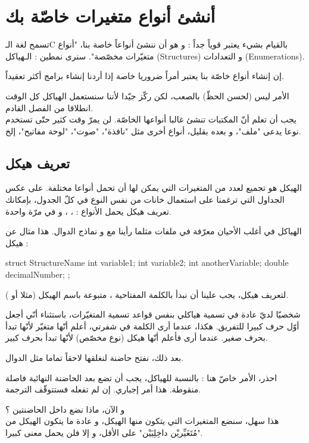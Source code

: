 \chapter{أنشئ أنواع متغيرات خاصّة بك}
تسمح لغة الـ\textenglish{C}
بالقيام بشيء يعتبر قوياً جداً : و هو أن ننشئ أنواعاً خاصة بنا، "أنواع متغيّرات مخصّصة". سنرى نمطين : الـهياكل
(\textenglish{Structures})
و التعدادات
(\textenglish{Enumerations}).

 إن إنشاء أنواع خاصّة بنا يعتبر أمراً ضروريا خاصة إذا أردنا إنشاء برامج أكثر تعقيداً.

الأمر ليس  (لحسن الحظّ) بالصعب، لكن ركّز جيّدا لأننا سنستعمل الهياكل كل الوقت انطلاقا من الفصل القادم.\\
يجب أن تعلم أنّ المكتبات تنشئ غالبا أنواعها الخاصّة. لن يمرّ وقت كثير حتّى تستخدم نوعا يدعى "ملف"، و بعده بقليل، أنواع أخرى مثل "نافذة"، "صوت"، "لوحة مفاتيح"، إلخ.

\section{تعريف هيكل}
الهيكل هو تجميع لعدد من المتغيرات التي يمكن لها أن تحمل أنواعا مختلفة. على عكس الجداول التي ترغمنا على استعمال خانات من نفس النوع في كلّ الجدول، بإمكانك تعريف هيكل يحمل الأنواع :
، ، 
و
في مرّة واحدة.

الهياكل في أغلب الأحيان معرّفة في ملفات
مثلما رأينا مع
و نماذج الدوال. هذا مثال عن هيكل :
\begin{Csource}
struct StructureName
{
	int variable1;
	int variable2;
	int anotherVariable;
	double decimalNumber;
};
\end{Csource}
لتعريف هيكل، يجب علينا أن نبدأ بالكلمة المفتاحية
،
متبوعة باسم الهيكل (مثلا
أو
).

\begin{information}
  شخصيّا لديّ عادة في تسمية هياكلي بنفس قواعد تسمية المتغيّرات، باستثناء أنّي أجعل أوّل حرف كبيرا للتفريق. هكذا، عندما أرى الكلمة
في شفرتي، أعلم أنّها متغيّر لأنّها تبدأ بحرف صغير. عندما أرى
فأعلم أنّها هيكل (نوع مخصّص) لأنّها تبدأ بحرف كبير.
\end{information}

بعد ذلك، نفتح حاضنة لنغلقها لاحقاً تماما مثل الدوال.

\begin{critical}
  احذر، الأمر خاصّ هنا : بالنسبة للهياكل، يجب أن تضع بعد الحاضنة النهائية فاصلة منقوطة. هذا أمر إجباري. إن لم تفعله فستتوقّف الترجمة.
\end{critical}
و الآن، ماذا نضع داخل الحاضنتين ؟\\
هذا سهل، سنضع المتغيرات التي يتكون منها الهيكل، و عادة ما يتكون الهيكل من "مُتَغَيِّريْن داخِلِيَيْن" على الأقل، و إلا فلن يحمل معنى كبيرا.

